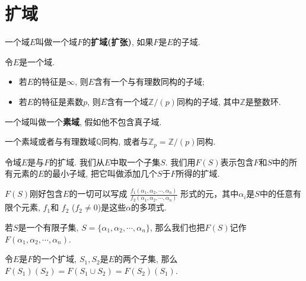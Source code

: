 \section{扩域}

\begin{Definition}[扩域]
一个域$E$叫做一个域$F$的\textbf{扩域(扩张)}, 如果$F$是$E$的子域.
\end{Definition}

\begin{Theorem}
令$E$是一个域. 
\begin{itemize}
\item 若$E$的特征是$\infty$, 则$E$含有一个与有理数同构的子域; 
\item 若$E$的特征是素数$p$, 则$E$含有一个域$\mathbb{Z}/(p)$同构的子域, 其中$\mathbb{Z}$是整数环.
\end{itemize}
\end{Theorem}

\begin{Definition}[素域]
一个域叫做一个\textbf{素域}, 假如他不包含真子域.
\end{Definition}

\begin{Note}
一个素域或者与有理数域$\mathbb{Q}$同构, 或者与$\mathbb{Z}_p = \mathbb{Z}/(p)$同构.
\end{Note}

\begin{Note}
令域$E$是与$F$的扩域. 我们从$E$中取一个子集$S$. 我们用$F(S)$表示包含$F$和$S$中的所有元素的$E$的最小子域, 把它叫做添加几个$S$于$F$所得的扩域.
\end{Note}

\begin{Note}
$F(S)$刚好包含$E$的一切可以写成
$\displaystyle \frac
{f_1(\alpha_1, \alpha_2, \cdots, \alpha_n)}
{f_2(\alpha_1, \alpha_2, \cdots, \alpha_n)}
$
形式的元，其中$\alpha_i$是$S$中的任意有限个元素, $f_1$和 $f_2$ ($ f_2 \neq 0$)是这些$\alpha$的多项式.
\end{Note}

\begin{Note}
若$S$是一个有限子集, $S = \{ \alpha_1, \alpha_2, \cdots, \alpha_n \}$, 那么我们也把$F(S)$记作$F(\alpha_1, \alpha_2, \cdots, \alpha_n)$.
\end{Note}

\begin{Theorem}
令$E$是$F$的一个扩域, $S_1, S_2$是$E$的两个子集, 那么$F(S_1)(S_2) = F(S_1 \cup S_2) = F(S_2)(S_1)$.
\end{Theorem}

